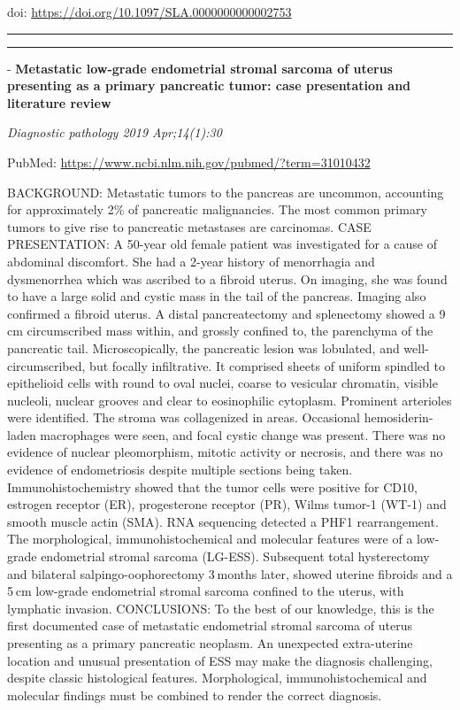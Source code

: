 \documentclass[]{article}
\begin{document}
doi: \url{https://doi.org/10.1097/SLA.0000000000002753}

{}

{}

\begin{center}\rule{0.5\linewidth}{\linethickness}\end{center}

\begin{center}\rule{0.5\linewidth}{\linethickness}\end{center}

 - \textbf{Metastatic low-grade endometrial stromal sarcoma of uterus
presenting as a primary pancreatic tumor: case presentation and
literature review}

\emph{Diagnostic pathology 2019 Apr;14(1):30}

PubMed: \url{https://www.ncbi.nlm.nih.gov/pubmed/?term=31010432}

BACKGROUND: Metastatic tumors to the pancreas are uncommon, accounting
for approximately 2\% of pancreatic malignancies. The most common
primary tumors to give rise to pancreatic metastases are carcinomas.
CASE PRESENTATION: A 50-year old female patient was investigated for a
cause of abdominal discomfort. She had a 2-year history of menorrhagia
and dysmenorrhea which was ascribed to a fibroid uterus. On imaging, she
was found to have a large solid and cystic mass in the tail of the
pancreas. Imaging also confirmed a fibroid uterus. A distal
pancreatectomy and splenectomy showed a 9 cm circumscribed mass within,
and grossly confined to, the parenchyma of the pancreatic tail.
Microscopically, the pancreatic lesion was lobulated, and
well-circumscribed, but focally infiltrative. It comprised sheets of
uniform spindled to epithelioid cells with round to oval nuclei, coarse
to vesicular chromatin, visible nucleoli, nuclear grooves and clear to
eosinophilic cytoplasm. Prominent arterioles were identified. The stroma
was collagenized in areas. Occasional hemosiderin-laden macrophages were
seen, and focal cystic change was present. There was no evidence of
nuclear pleomorphism, mitotic activity or necrosis, and there was no
evidence of endometriosis despite multiple sections being taken.
Immunohistochemistry showed that the tumor cells were positive for CD10,
estrogen receptor (ER), progesterone receptor (PR), Wilms tumor-1 (WT-1)
and smooth muscle actin (SMA). RNA sequencing detected a PHF1
rearrangement. The morphological, immunohistochemical and molecular
features were of a low-grade endometrial stromal sarcoma (LG-ESS).
Subsequent total hysterectomy and bilateral salpingo-oophorectomy
3 months later, showed uterine fibroids and a 5 cm low-grade endometrial
stromal sarcoma confined to the uterus, with lymphatic invasion.
CONCLUSIONS: To the best of our knowledge, this is the first documented
case of metastatic endometrial stromal sarcoma of uterus presenting as a
primary pancreatic neoplasm. An unexpected extra-uterine location and
unusual presentation of ESS may make the diagnosis challenging, despite
classic histological features. Morphological, immunohistochemical and
molecular findings must be combined to render the correct diagnosis.
\end{document}
